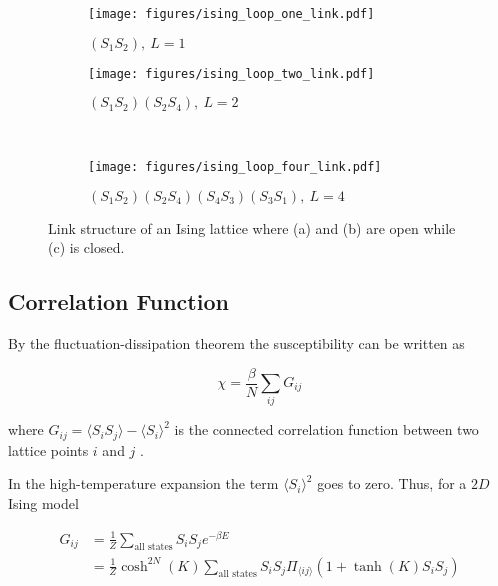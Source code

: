 \begin{figure}[h!]
    \begin{subfigure}{.5\linewidth}
        \centering
        \texttt{[image: figures/ising\_loop\_one\_link.pdf]}
        \caption{$(S_1 S_2), \ L = 1$}
        \label{fig:oneLinkIsing}
    \end{subfigure}%
    \begin{subfigure}{.5\linewidth}
        \centering
        \texttt{[image: figures/ising\_loop\_two\_link.pdf]}
        \caption{$(S_1 S_2)(S_2 S_4), \ L = 2$}
        \label{fig:twoLinkIsing}
    \end{subfigure}\\[1ex]
    \begin{subfigure}{\linewidth}
        \centering
        \texttt{[image: figures/ising\_loop\_four\_link.pdf]}
        \caption{$(S_1 S_2)(S_2 S_4)(S_4 S_3)(S_3 S_1), \ L = 4$}
    \label{fig:fourLinkIsing}
    \end{subfigure}
    \caption{Link structure of an Ising lattice where (a) and (b) are open while (c) is closed.}
    \label{fig:LinkIsing}
\end{figure}

\newpage

\subsection{Correlation Function}
\label{subsec:CorrelationFunction}

By the fluctuation-dissipation theorem the susceptibility can be written as 

\begin{equation}
    \chi = \frac{\beta}{N} \sum_{ij} G_{ij}
\end{equation}

\noindent where $G_{ij} = \langle S_i S_j \rangle - \langle S_i \rangle^2$ is the connected correlation function between two lattice points $i$ and $j$ \cite{Chaikin:PrincCondencedMatterPhysics}.

In the high-temperature expansion the term $\langle S_i \rangle^2$ goes to zero. Thus, for a $2D$ Ising model

\begin{align}
    G_{ij} &= \frac{1}{Z} \sum_{\text{all states}} S_i S_j e^{-\beta E} \\
    &= \frac{1}{Z} \cosh^{2N} (K) \sum_{\text{all states}} S_i S_j \Pi_{\langle ij \rangle} (1 + \tanh(K) S_i S_j)
\end{align}

